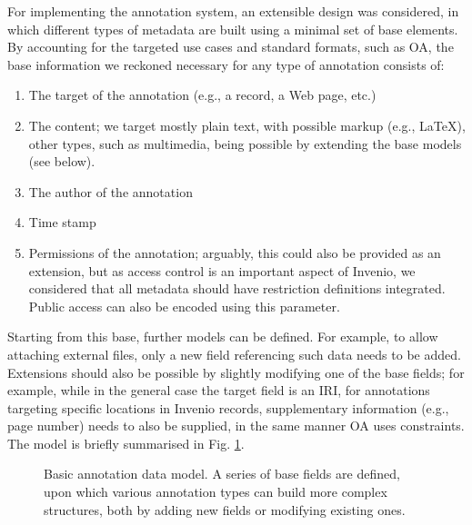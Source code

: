 
For implementing the annotation system, an extensible design was considered, in
which different types of metadata are built using a minimal set of base
elements.  By accounting for the targeted use cases and standard formats, such
as OA, the base information we reckoned necessary for any type of annotation
consists of:
\begin{enumerate}
  \item The target of the annotation (e.g., a record, a Web page, etc.)
  \item The content; we target mostly plain text, with possible markup
        (e.g., LaTeX), other types, such as multimedia, being possible by
        extending the base models (see below).
  \item The author of the annotation
  \item Time stamp
  \item Permissions of the annotation; arguably, this could also be provided as
        an extension, but as access control is an important aspect of Invenio,
        we considered that all metadata should have restriction definitions
        integrated. Public access can also be encoded using this parameter.
\end{enumerate}

Starting from this base, further models can be defined. For example, to allow
attaching external files, only a new field referencing such data needs to be
added. Extensions should also be possible by slightly modifying one of the base
fields; for example, while in the general case the target field is an IRI, for
annotations targeting specific locations in Invenio records, supplementary
information (e.g., page number) needs to also be supplied, in the same manner
OA uses constraints. The model is briefly summarised in Fig.
\ref{fig:datamodel}.

\begin{figure}[!ht]
  \centering
  \caption[Basic annotation data model]
          {Basic annotation data model. A series of base fields are defined,
           upon which various annotation types can build more complex
           structures, both by adding new fields or modifying existing ones.}
  \label{fig:datamodel}
\end{figure}

